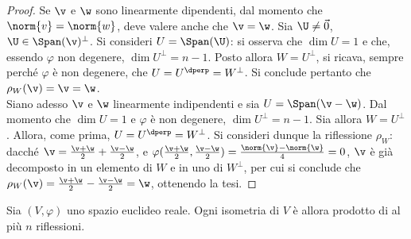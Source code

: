 \begin{proof} Se $\v$ e $\w$ sono linearmente dipendenti, dal momento che $\norm{v} = \norm{w}$, deve valere anche
	che $\v = \w$. Sia $\U \neq \vec 0$, $\U \in \Span(\v)^\perp$. Si consideri $U = \Span(\U)$: si osserva che
	$\dim U = 1$ e che, essendo $\varphi$ non degenere, $\dim U^\perp = n-1$. Posto allora $W = U^\perp$, si ricava,
	sempre perché $\varphi$ è non degenere, che $U = U^\dperp = W^\perp$. Si conclude pertanto che $\rho_W(\v) =
	\v = \w$. \\
	
	Siano adesso $\v$ e $\w$ linearmente indipendenti e sia $U = \Span(\v - \w)$. Dal momento che $\dim U = 1$ e $\varphi$ è non degenere, $\dim U^\perp = n-1$. Sia allora $W = U^\perp$. Allora, come prima, $U = U^\dperp = W^\perp$. Si consideri dunque la riflessione $\rho_W$: dacché $\v = \frac{\v + \w}{2} + \frac{\v - \w}{2}$, e $\varphi(\frac{\v + \w}{2}, \frac{\v - \w}{2}) = \frac{\norm{\v} - \norm{\w}}{4} = 0$, $\v$ è già decomposto in un elemento di $W$ e in uno di $W^\perp$, per cui si conclude che $\rho_W(\v) =
	\frac{\v + \w}{2} - \frac{\v - \w}{2} = \w$, ottenendo la tesi.
	
\end{proof}

\begin{theorem}  Sia $(V, \varphi)$ uno spazio euclideo reale.
	Ogni isometria di $V$ è allora prodotto di al più $n$ riflessioni.
\end{theorem}

